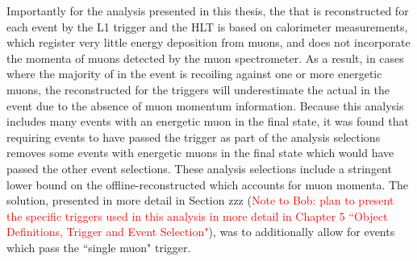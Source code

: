 Importantly for the analysis presented in this thesis, the \met that is reconstructed for each event by the L1 trigger and the HLT is based on calorimeter measurements, which register very little energy deposition from muons, and does not incorporate the momenta of muons detected by the muon spectrometer. As a result, in cases where the majority of \met in the event is recoiling against one or more energetic muons, the \met reconstructed for the triggers will underestimate the actual \met in the event due to the absence of muon momentum information. Because this analysis includes many events with an energetic muon in the final state, it was found that requiring events to have passed the \met trigger as part of the analysis selections removes some events with energetic muons in the final state which would have passed the other event selections. These analysis selections include a stringent lower bound on the offline-reconstructed \met which accounts for muon momenta. The solution, presented in more detail in Section zzz (\textcolor{red}{Note to Bob: plan to present the specific triggers used in this analysis in more detail in Chapter 5 ``Object Definitions, Trigger and Event Selection"}), was to additionally allow for events which pass the ``single muon" trigger.


